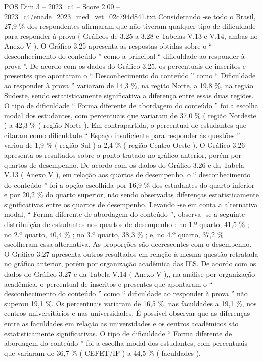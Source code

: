 \begin{textsample}{POS Dim 3 – 2023\_c4 – Score 2.00 – 2023\_c4/enade\_2023\_med\_vet\_02c794d841.txt}
Considerando -se todo o Brasil, 27,9 \% dos respondentes afirmaram que não tiveram qualquer tipo de dificuldade para responder à prova ( Gráficos de 3.25 a 3.28 e Tabelas V.13 e V.14, ambas no Anexo V ).
O Gráfico 3.25 apresenta as respostas obtidas sobre o “ desconhecimento do conteúdo ” como a principal “ dificuldade ao responder à prova ”.
De acordo com os dados do Gráfico 3.25, os percentuais de inscritos e presentes que apontaram o “ Desconhecimento do conteúdo ” como “ Dificuldade ao responder à prova ” variaram de 14,3 \%, na região Norte, a 19,8 \%, na região Sudeste, sendo estatisticamente significativa a diferença entre essas duas regiões.
O tipo de dificuldade “ Forma diferente de abordagem do conteúdo ” foi a escolha modal dos estudantes, com percentuais que variaram de 37,0 \% ( região Nordeste ) a 42,3 \% ( região Norte ).
Em contrapartida, o percentual de estudantes que citaram como dificuldade “ Espaço insuficiente para responder às questões ” variou de 1,9 \% ( região Sul ) a 2,4 \% ( região Centro-Oeste ).
O Gráfico 3.26 apresenta os resultados sobre o ponto tratado no gráfico anterior, porém por quartos de desempenho.
De acordo com os dados do Gráfico 3.26 e da Tabela V.13 ( Anexo V ), em relação aos quartos de desempenho, o “ desconhecimento do conteúdo ” foi a opção escolhida por 16,9 \% dos estudantes do quarto inferior e por 20,2 \% do quarto superior, não sendo observadas diferenças estatisticamente significativas entre os quartos de desempenho.
Levando -se em conta a alternativa modal, “ Forma diferente de abordagem do conteúdo ”, observa -se a seguinte distribuição de estudantes nos quartos de desempenho : no 1.º quarto, 41,5 \% ; no 2.º quarto, 40,4 \% ; no 3.º quarto, 38,3 \% ; e, no 4.º quarto, 37,2 \% escolheram essa alternativa.
As proporções são decrescentes com o desempenho.
O Gráfico 3.27 apresenta outros resultados em relação à mesma questão retratada no gráfico anterior, porém por organização acadêmica das IES.
De acordo com os dados do Gráfico 3.27 e da Tabela V.14 ( Anexo V ),, na análise por organização acadêmica, o percentual de inscritos e presentes que apontaram o “ desconhecimento do conteúdo ” como “ dificuldade ao responder à prova ” não superou 19,1 \%.
Os percentuais variaram de 16,5 \%, nas faculdades a 19,1 \%, nos centros universitários e nas universidades.
É possível observar que as diferenças entre as faculdades em relação as universidades e os centros acadêmicos são estatisticamente significativas.
O tipo de dificuldade “ Forma diferente de abordagem do conteúdo ” foi a escolha modal dos estudantes, com percentuais que variaram de 36,7 \% ( CEFET/IF ) a 44,5 \% ( faculdades ).

\end{textsample}
